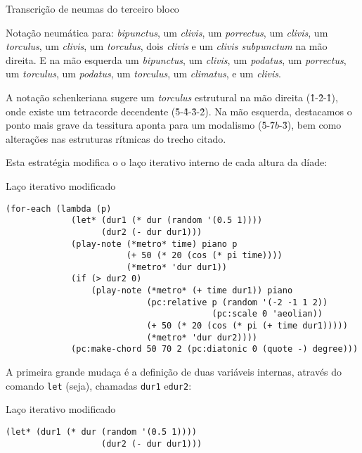 \begin{example}{Transcrição de neumas do terceiro bloco}\label{fig:neumaMD3}

  Notação neumática para: \emph{bipunctus}, um \emph{clivis}, um \emph{porrectus}, um \emph{clivis}, um \emph{torculus}, um \emph{clivis}, um \emph{torculus}, dois \emph{clivis} e um \emph{clivis subpunctum} na mão direita. E na mão esquerda um \emph{bipunctus}, um \emph{clivis}, um \emph{podatus}, um \emph{porrectus}, um \emph{torculus}, um \emph{podatus}, um \emph{torculus}, um \emph{climatus}, e um \emph{clivis}.

  \centering{}

  A notação schenkeriana sugere um \emph{torculus} estrutural na mão direita (\^1-\^2-\^1), onde existe um tetracorde decendente (\^5-\^4-\^3-\^2). Na mão esquerda, destacamos o ponto mais grave da tessitura aponta para um modalismo (\^5-\^7$b$-\^3), bem como alterações nas estruturas rítmicas do trecho citado.
  

  \centering{}
\end{example}

Esta estratégia modifica o o laço iterativo interno de cada altura da díade:

\begin{example}{Laço iterativo modificado}
\begin{verbatim}
(for-each (lambda (p)
             (let* (dur1 (* dur (random '(0.5 1))))
                   (dur2 (- dur dur1)))
             (play-note (*metro* time) piano p
                        (+ 50 (* 20 (cos (* pi time))))
                        (*metro* 'dur dur1))
             (if (> dur2 0)
                 (play-note (*metro* (+ time dur1)) piano
                            (pc:relative p (random '(-2 -1 1 2))
                                         (pc:scale 0 'aeolian))
                            (+ 50 (* 20 (cos (* pi (+ time dur1)))))
                            (*metro* 'dur dur2))))
             (pc:make-chord 50 70 2 (pc:diatonic 0 (quote -) degree)))
\end{verbatim}
\end{example}

A primeira grande mudaça é a definição de duas variáveis internas, através do comando \verb|let| (seja), chamadas \verb|dur1| e\verb|dur2|:

\begin{example}{Laço iterativo modificado}
\begin{verbatim}
(let* (dur1 (* dur (random '(0.5 1))))
                   (dur2 (- dur dur1)))
\end{verbatim}
\end{example}

